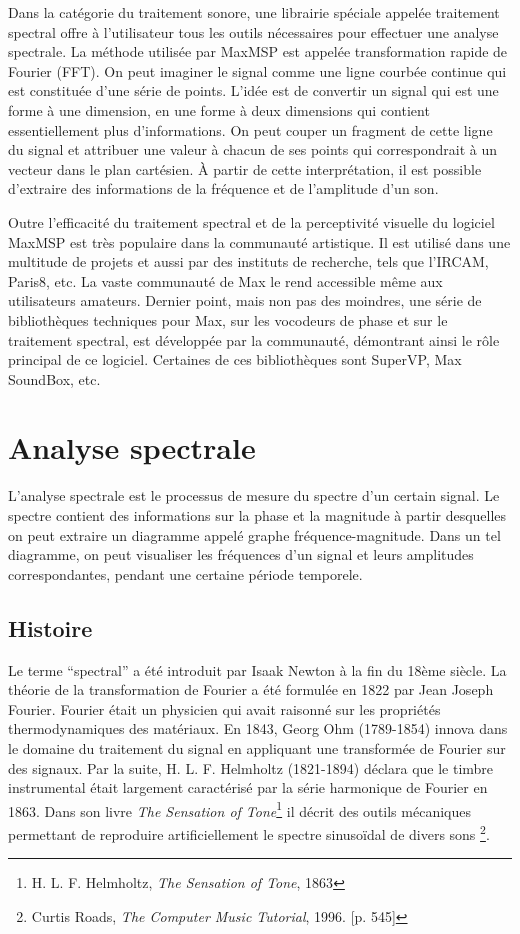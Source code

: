 Dans la catégorie du traitement sonore, une librairie spéciale appelée traitement spectral offre à l'utilisateur tous les outils nécessaires pour effectuer une analyse spectrale. La méthode utilisée par MaxMSP est appelée transformation rapide de Fourier (FFT). On peut imaginer le signal comme une ligne courbée continue qui est constituée d’une série de points. L'idée est de convertir un signal qui est une forme à une dimension, en une forme à deux dimensions qui contient essentiellement plus d'informations. On peut couper un fragment de cette ligne du signal et attribuer une valeur à chacun de ses points qui correspondrait à un vecteur dans le plan cartésien. À partir de cette interprétation, il est possible d'extraire des informations de la fréquence et de l'amplitude d’un son.

Outre l'efficacité du traitement spectral et de la perceptivité visuelle du logiciel MaxMSP est très populaire dans la communauté artistique. Il est utilisé dans une multitude de projets et aussi par des instituts de recherche, tels que l'IRCAM, Paris8, etc. La vaste communauté de Max le rend accessible même aux utilisateurs amateurs. Dernier point, mais non pas des moindres, une série de bibliothèques techniques pour Max, sur les vocodeurs de phase et sur le traitement spectral, est développée par la communauté, démontrant ainsi le rôle principal de ce logiciel. Certaines de ces bibliothèques sont SuperVP, Max SoundBox, etc.

\section{Analyse spectrale}

L'analyse spectrale est le processus de mesure du spectre d'un certain signal. Le spectre contient des informations sur la phase et la magnitude à partir desquelles on peut extraire un diagramme appelé graphe fréquence-magnitude. Dans un tel diagramme, on peut visualiser les fréquences d’un signal et leurs amplitudes correspondantes, pendant une certaine période temporele.

	\subsection{Histoire}

Le terme “spectral” a été introduit par Isaak Newton à la fin du 18ème siècle. La théorie de la transformation de Fourier a été formulée en 1822 par Jean Joseph Fourier. Fourier était un physicien qui avait raisonné sur les propriétés thermodynamiques des matériaux. En 1843, Georg Ohm (1789-1854) innova dans le domaine du traitement du signal en appliquant une transformée de Fourier sur des signaux. Par la suite, H. L. F. Helmholtz (1821-1894) déclara que le timbre instrumental était largement caractérisé par la série harmonique de Fourier en 1863. Dans son livre \textit{The Sensation of Tone}\footnote{H. L. F. Helmholtz, \textit{The Sensation of Tone}, 1863} il décrit des outils mécaniques permettant de reproduire artificiellement le spectre sinusoïdal de divers sons \footnote{ Curtis Roads, \textit{The Computer Music Tutorial}, 1996. [p. 545] \nocite{Routes: 1996: CMT: 525484}}.


